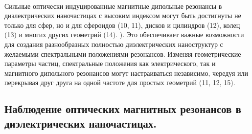 \\
\hspace*{2mm}
Сильные оптически индуцированные магнитные дипольные резонансы в диэлектрических наночастицах с высоким индексом могут быть достигнуты не только для сфер, но и для сфероидов (10, 11), дисков и цилиндров (12), колец (13) и многих других геометрий (14). ). Это обеспечивает важные возможности для создания разнообразных полностью диэлектрических наноструктур с желаемыми спектральными положениями резонансов. Изменяя геометрические параметры частиц, спектральные положения как электрического, так и магнитного дипольного резонансов могут настраиваться независимо, чередуя или перекрывая друг друга на одной частоте для простых геометрий (11, 12, 15).


\subsection{Наблюдение оптических магнитных резонансов в диэлектрических наночастицах.}

